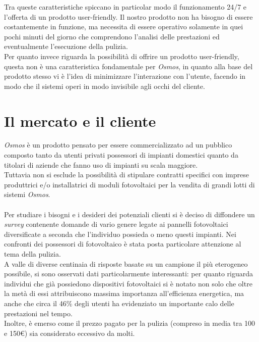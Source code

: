 \documentclass[a4paper, 12pt]{article}
\begin{document}
	Tra queste caratteristiche spiccano in particolar modo il funzionamento 24/7 e l'offerta di un prodotto user-friendly. Il nostro prodotto non ha bisogno di essere costantemente in funzione, ma necessita di essere operativo solamente in quei pochi minuti del giorno che comprendono l'analisi delle prestazioni ed eventualmente l'esecuzione della pulizia.\\
	Per quanto invece riguarda la possibilità di offrire un prodotto user-friendly, questa non è una caratteristica fondamentale per \emph{Osmos}, in quanto alla base del prodotto stesso vi è l'idea di minimizzare l'interazione con l'utente, facendo in modo che il sistemi operi in modo invisibile agli occhi del cliente.
	\section{Il mercato e il cliente}
	\emph{Osmos} è un prodotto pensato per essere commercializzato ad un pubblico composto tanto da utenti privati possessori di impianti domestici quanto da titolari di aziende che fanno uso di impianti su scala maggiore.\\
	Tuttavia non si esclude la possibilità di stipulare contratti specifici con imprese produttrici e/o installatrici di moduli fotovoltaici per la vendita di grandi lotti di sistemi \emph{Osmos}.\\\\
	Per studiare i bisogni e i desideri dei potenziali clienti si è deciso di diffondere un \emph{survey} contenente domande di vario genere legate ai pannelli fotovoltaici diversificate a seconda che l'individuo possieda o meno questi impianti. Nei confronti dei possessori di fotovoltaico è stata posta particolare attenzione al tema della pulizia.\\
	A valle di diverse centinaia di risposte basate su un campione il più eterogeneo possibile, si sono osservati dati particolarmente interessanti: per quanto riguarda individui che già possiedono dispositivi fotovoltaici si è notato non solo che oltre la metà di essi attribuiscono massima importanza all'efficienza energetica, ma anche che circa il 46\% degli utenti ha evidenziato un importante calo delle prestazioni nel tempo.\\
	Inoltre, è emerso come il prezzo pagato per la pulizia (compreso in media tra 100 e 150\euro) sia considerato eccessivo da molti.
\end{document}

